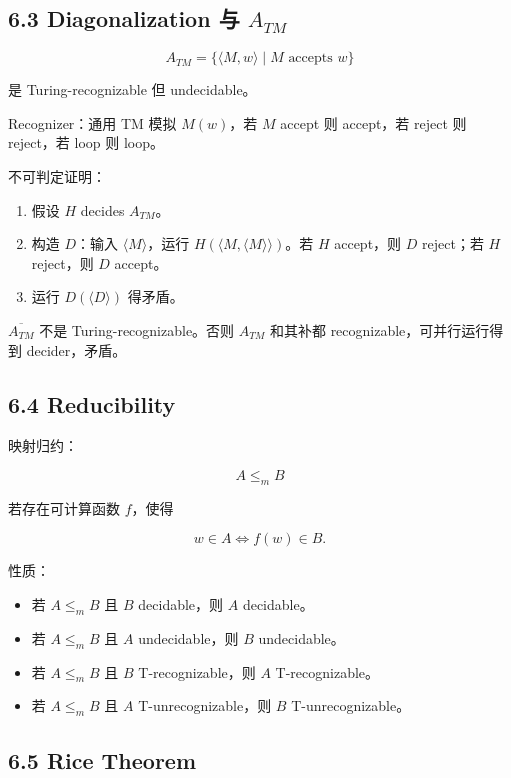 ﻿\documentclass[UTF8,11pt]{ctexart}
\begin{document}
\subsection{6.3 Diagonalization 与 \(A_{TM}\)}


\[
A_{TM}=\{\langle M,w\rangle\mid M\text{ accepts }w\}
\]

是 Turing-recognizable 但 undecidable。


Recognizer：通用 TM 模拟 \(M(w)\)，若 \(M\) accept 则 accept，若 reject 则 reject，若 loop 则 loop。


不可判定证明：


\begin{enumerate}
\item 假设 \(H\) decides \(A_{TM}\)。
\item 构造 \(D\)：输入 \(\langle M\rangle\)，运行 \(H(\langle M,\langle M\rangle\rangle)\)。若 \(H\) accept，则 \(D\) reject；若 \(H\) reject，则 \(D\) accept。
\item 运行 \(D(\langle D\rangle)\) 得矛盾。
\end{enumerate}


\(\overline{A_{TM}}\) 不是 Turing-recognizable。否则 \(A_{TM}\) 和其补都 recognizable，可并行运行得到 decider，矛盾。


\subsection{6.4 Reducibility}


映射归约：

\[
A\le_m B
\]

若存在可计算函数 \(f\)，使得

\[
w\in A\iff f(w)\in B.
\]


性质：


\begin{itemize}
\item 若 \(A\le_m B\) 且 \(B\) decidable，则 \(A\) decidable。
\item 若 \(A\le_m B\) 且 \(A\) undecidable，则 \(B\) undecidable。
\item 若 \(A\le_m B\) 且 \(B\) T-recognizable，则 \(A\) T-recognizable。
\item 若 \(A\le_m B\) 且 \(A\) T-unrecognizable，则 \(B\) T-unrecognizable。
\end{itemize}


\subsection{6.5 Rice Theorem}
\end{document}

